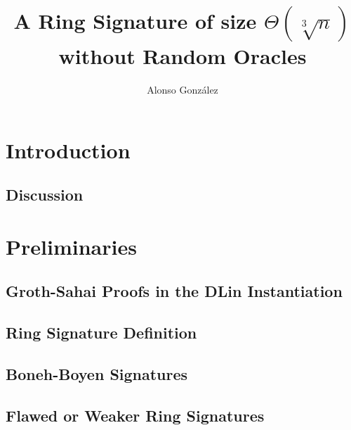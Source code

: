 \documentclass{llncs}
\author{Alonso Gonz\'alez}
\institute
{
	Ecole Normale Sup´\'erieure de Lyon, Laboratoire LIP (France)\\
	\email{alonso.gonzalez@ens-lyon.fr}
}
\title{A Ring Signature of size $\Theta(\sqrt[3]{n})$ without Random Oracles}
\begin{document}
	
\maketitle
\begin{abstract}
    
\end{abstract} 

\section{Introduction}
     

    \subsection{Discussion}

    	



\section{Preliminaries}

	
        
	\subsection{Groth-Sahai Proofs in the DLin Instantiation} \label{sec:gs-proofs}
        
            

                \subsection{Ring Signature Definition}
    
            

        \subsection{Boneh-Boyen Signatures} \label{sec:bbs}
    
            

    \subsection{Flawed or Weaker Ring Signatures}\label{sec:rs-flawed}
    
         
\end{document}
